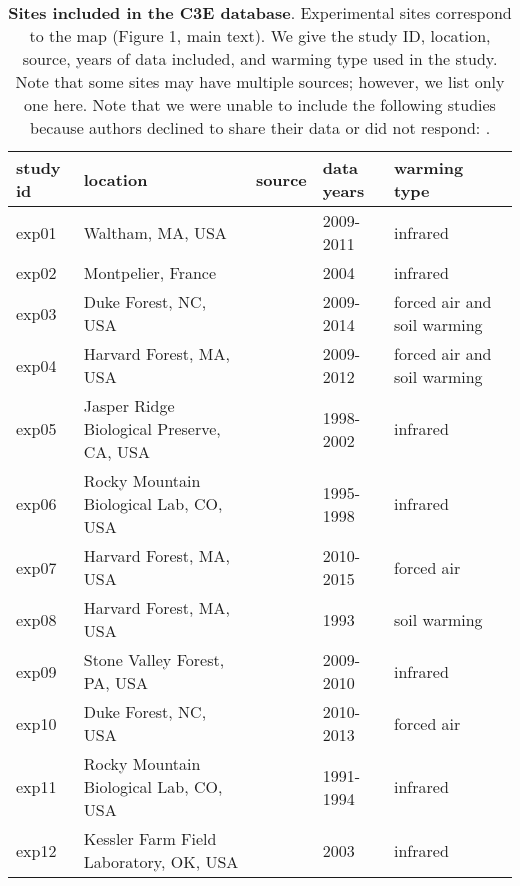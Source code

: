 \documentclass{article}
\begin{document}
\begin{table}[b]
  \caption{\textbf{Sites included in the C3E database}. Experimental sites correspond to the map (Figure 1, main text). We give the study ID, location, source, years of data included, and warming type used in the study. Note that some sites may have multiple sources; however, we list only one here. Note that we were unable to include the following studies because authors declined to share their data or did not respond: \citep{schwartzberg2014,moser2011,caron2015,ellebjerg2008}.}
\begin{footnotesize} 
   \begin{tabular}{| p{1.2cm} | p{5.7cm} | p{3.5cm} | p{1.5cm} | p{2cm} |}
    \hline
  study id & location & source & data years & warming type \\ \hline
    exp01 & Waltham, MA, USA & \cite{hoeppner2012} & 2009-2011 & infrared\\ \hline
    exp02 & Montpelier, France & \cite{morin2010} & 2004 & infrared\\ \hline
    exp03 & Duke Forest, NC, USA & \cite{clark2014a} & 2009-2014 & forced air and soil warming\\ \hline
    exp04 & Harvard Forest, MA, USA & \cite{clark2014a} & 2009-2012 & forced air and soil warming\\ \hline
    exp05 & Jasper Ridge Biological Preserve, CA, USA & \cite{cleland2007} & 1998-2002 & infrared\\ \hline
    exp06 & Rocky Mountain Biological Lab, CO, USA & \cite{dunne2003} & 1995-1998 & infrared\\ \hline
    exp07 & Harvard Forest, MA, USA & \cite{pelini2011} & 2010-2015 & forced air \\ \hline
    exp08 & Harvard Forest, MA, USA & \cite{farnsworth1995} & 1993 & soil warming \\ \hline
    exp09 & Stone Valley Forest, PA, USA & \cite{rollinson2012} & 2009-2010 & infrared \\ \hline
    exp10 & Duke Forest, NC, USA & \cite{marchin2015} & 2010-2013 & forced air \\ \hline
    exp11 & Rocky Mountain Biological Lab, CO, USA & \cite{price1998} & 1991-1994 & infrared\\ \hline
    exp12 & Kessler Farm Field Laboratory, OK, USA & \cite{sherry2007} & 2003 & infrared\\ \hline
     \end{tabular} 
    \end{footnotesize}  
    \end{table}
  
\end{document}
